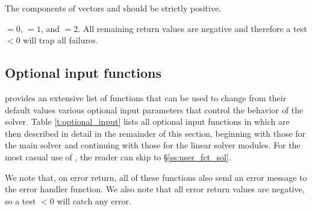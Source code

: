 {
  The components of vectors  and  should be strictly positive.
  
   $=0$,  $=1$, and 
   $=2$.
  All remaining return values are negative and therefore a test  $< 0$
  will trap all  failures.
}


\subsection{Optional input functions}\label{ss:optional_input}

{\kinsol} provides an extensive list of functions that can be used to change
from their default values various optional input parameters that control the
behavior of the {\kinsol} solver. 
Table \ref{t:optional_input} lists all optional input functions in {\kinsol} which 
are then described in detail in the remainder of this section, beginning with those
for the main {\kinsol} solver and continuing with those for the linear solver
modules. For the most casual use of {\kinsol}, the reader can skip to \S\ref{ss:user_fct_sol}.

We note that, on error return, all of these functions also send an error message
to the error handler function.
We also note that all error return values are negative, so a test  $<0$
will catch any error.

